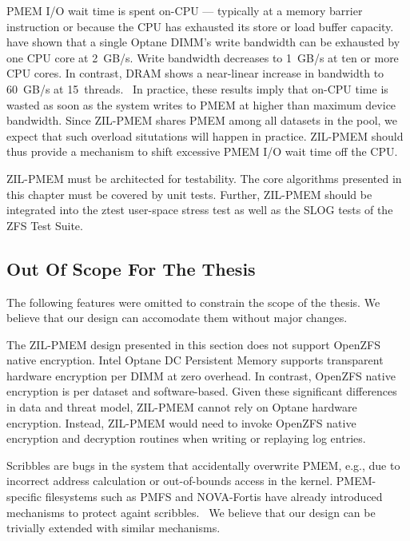 \documentclass[12pt,a4paper,twoside]{book}
\begin{document}
PMEM I/O wait time is spent on-CPU --- typically at a memory barrier instruction or because the CPU has exhausted its store or load buffer capacity.
\citeauthor{yangEmpiricalGuideBehavior2020} have shown that a single Optane DIMM's write bandwidth can be exhausted by one CPU core at \SI{2}{GB/s}.
Write bandwidth decreases to \SI{1}{GB/s} at ten or more CPU cores.
In contrast, DRAM shows a near-linear increase in bandwidth to \SI{60}{GB/s} at 15~threads.~\cite[fig.4]{yangEmpiricalGuideBehavior2020}
In practice, these results imply that on-CPU time is wasted as soon as the system writes to PMEM at higher than maximum device bandwidth.
Since ZIL-PMEM shares PMEM among all datasets in the pool, we expect that such overload situtations will happen in practice.
ZIL-PMEM should thus provide a mechanism to shift excessive PMEM I/O wait time off the CPU.

ZIL-PMEM must be architected for testability.
The core algorithms presented in this chapter must be covered by unit tests.
Further, ZIL-PMEM should be integrated into the ztest user-space stress test as well as the SLOG tests of the ZFS Test Suite.

\subsection{Out Of Scope For The Thesis}
The following features were omitted to constrain the scope of the thesis.
We believe that our design can accomodate them without major changes.

The ZIL-PMEM design presented in this section does not support OpenZFS native encryption.
Intel Optane DC Persistent Memory supports transparent hardware encryption per DIMM at zero overhead.
In contrast, OpenZFS native encryption is per dataset and software-based.
Given these significant differences in data and threat model, ZIL-PMEM cannot rely on Optane hardware encryption.
Instead, ZIL-PMEM would need to invoke OpenZFS native encryption and decryption routines when writing or replaying log entries.

Scribbles are bugs in the system that accidentally overwrite PMEM, e.g., due to incorrect address calculation or out-of-bounds access in the kernel.
PMEM-specific filesystems such as PMFS and NOVA-Fortis have already introduced mechanisms to protect againt scribbles.~\cite{dulloorSystemSoftwarePersistent2014,xuNOVAFortisFaulttolerantNonvolatile2017}
We believe that our design can be trivially extended with similar mechanisms.
\end{document}
